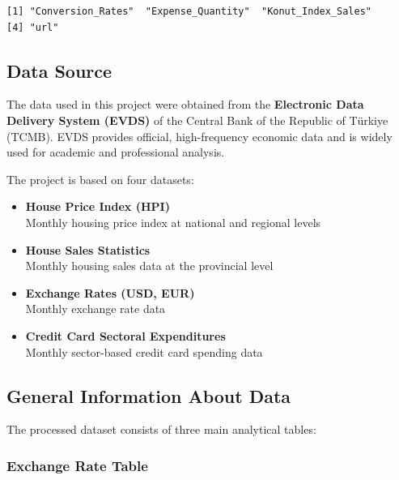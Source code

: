 \documentclass[
  11pt,
  a4paper,
  DIV=11,
  numbers=noendperiod]{scrartcl}
\begin{document}
\begin{verbatim}
[1] "Conversion_Rates"  "Expense_Quantity"  "Konut_Index_Sales"
[4] "url"              
\end{verbatim}

\subsection{Data Source}\label{data-source}

The data used in this project were obtained from the \textbf{Electronic
Data Delivery System (EVDS)} of the Central Bank of the Republic of
Türkiye (TCMB). EVDS provides official, high-frequency economic data and
is widely used for academic and professional analysis.

The project is based on four datasets:

\begin{itemize}
\item
  \textbf{House Price Index (HPI)}\\
  Monthly housing price index at national and regional levels
\item
  \textbf{House Sales Statistics}\\
  Monthly housing sales data at the provincial level
\item
  \textbf{Exchange Rates (USD, EUR)}\\
  Monthly exchange rate data
\item
  \textbf{Credit Card Sectoral Expenditures}\\
  Monthly sector-based credit card spending data
\end{itemize}

\subsection{General Information About
Data}\label{general-information-about-data}

The processed dataset consists of three main analytical tables:

\subsubsection{Exchange Rate Table}\label{exchange-rate-table}
\end{document}
